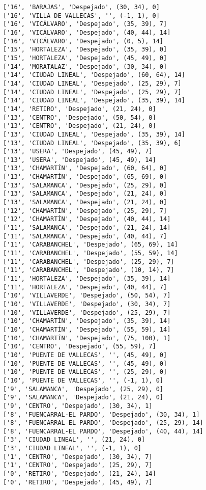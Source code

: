 \documentclass[11pt]{article}
\begin{document}
\begin{Verbatim}[commandchars=\\\{\}]
['16', 'BARAJAS', 'Despejado', (30, 34), 0]
['16', 'VILLA DE VALLECAS', '', (-1, 1), 0]
['16', 'VICÁLVARO', 'Despejado', (35, 39), 7]
['16', 'VICÁLVARO', 'Despejado', (40, 44), 14]
['16', 'VICÁLVARO', 'Despejado', (0, 5), 14]
['15', 'HORTALEZA', 'Despejado', (35, 39), 0]
['15', 'HORTALEZA', 'Despejado', (45, 49), 0]
['14', 'MORATALAZ', 'Despejado', (30, 34), 0]
['14', 'CIUDAD LINEAL', 'Despejado', (60, 64), 14]
['14', 'CIUDAD LINEAL', 'Despejado', (25, 29), 7]
['14', 'CIUDAD LINEAL', 'Despejado', (25, 29), 7]
['14', 'CIUDAD LINEAL', 'Despejado', (35, 39), 14]
['14', 'RETIRO', 'Despejado', (21, 24), 0]
['13', 'CENTRO', 'Despejado', (50, 54), 0]
['13', 'CENTRO', 'Despejado', (21, 24), 0]
['13', 'CIUDAD LINEAL', 'Despejado', (35, 39), 14]
['13', 'CIUDAD LINEAL', 'Despejado', (35, 39), 6]
['13', 'USERA', 'Despejado', (45, 49), 7]
['13', 'USERA', 'Despejado', (45, 49), 14]
['13', 'CHAMARTÍN', 'Despejado', (60, 64), 0]
['13', 'CHAMARTÍN', 'Despejado', (65, 69), 0]
['13', 'SALAMANCA', 'Despejado', (25, 29), 0]
['13', 'SALAMANCA', 'Despejado', (21, 24), 0]
['13', 'SALAMANCA', 'Despejado', (21, 24), 0]
['12', 'CHAMARTÍN', 'Despejado', (25, 29), 7]
['12', 'CHAMARTÍN', 'Despejado', (40, 44), 14]
['11', 'SALAMANCA', 'Despejado', (21, 24), 14]
['11', 'SALAMANCA', 'Despejado', (40, 44), 7]
['11', 'CARABANCHEL', 'Despejado', (65, 69), 14]
['11', 'CARABANCHEL', 'Despejado', (55, 59), 14]
['11', 'CARABANCHEL', 'Despejado', (25, 29), 7]
['11', 'CARABANCHEL', 'Despejado', (10, 14), 7]
['11', 'HORTALEZA', 'Despejado', (35, 39), 14]
['11', 'HORTALEZA', 'Despejado', (40, 44), 7]
['10', 'VILLAVERDE', 'Despejado', (50, 54), 7]
['10', 'VILLAVERDE', 'Despejado', (30, 34), 7]
['10', 'VILLAVERDE', 'Despejado', (25, 29), 7]
['10', 'CHAMARTÍN', 'Despejado', (35, 39), 14]
['10', 'CHAMARTÍN', 'Despejado', (55, 59), 14]
['10', 'CHAMARTÍN', 'Despejado', (75, 100), 1]
['10', 'CENTRO', 'Despejado', (55, 59), 7]
['10', 'PUENTE DE VALLECAS', '', (45, 49), 0]
['10', 'PUENTE DE VALLECAS', '', (45, 49), 0]
['10', 'PUENTE DE VALLECAS', '', (25, 29), 0]
['10', 'PUENTE DE VALLECAS', '', (-1, 1), 0]
['9', 'SALAMANCA', 'Despejado', (25, 29), 0]
['9', 'SALAMANCA', 'Despejado', (21, 24), 0]
['9', 'CENTRO', 'Despejado', (30, 34), 1]
['8', 'FUENCARRAL-EL PARDO', 'Despejado', (30, 34), 1]
['8', 'FUENCARRAL-EL PARDO', 'Despejado', (25, 29), 14]
['8', 'FUENCARRAL-EL PARDO', 'Despejado', (40, 44), 14]
['3', 'CIUDAD LINEAL', '', (21, 24), 0]
['3', 'CIUDAD LINEAL', '', (-1, 1), 0]
['1', 'CENTRO', 'Despejado', (30, 34), 7]
['1', 'CENTRO', 'Despejado', (25, 29), 7]
['0', 'RETIRO', 'Despejado', (21, 24), 14]
['0', 'RETIRO', 'Despejado', (45, 49), 7]

\end{Verbatim}
\end{document}
